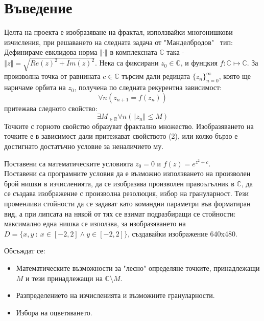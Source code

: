 \section{Въведение}
	\begin{Large}
	Целта на проекта е изобразяване на фрактал, използвайки многонишкови изчисления, при решаването на следната задача от "Манделбродов" \ тип:\\
	
	\indent Дефинираме евклидова норма $\left\Vert \cdot \right\Vert$ в комплексната $\mathbb{C}$ така - \ $\left\Vert z \right\Vert=\sqrt{Re(z)^2+Im(z)^2}$. Нека са фиксирани $z_{0}\in\mathbb{C}$, и фунцкия $f:\mathbb{C}\mapsto\mathbb{C}$. За произволна точка от равнината $c\in\mathbb{C}$ търсим дали редицата $\{z_{n}\}_{n=0}^{\infty}$, която ще наричаме орбита на $z_{0}$, получена по следната рекурентна зависимост: 
	\begin{equation} \label{eq:1}
	\forall{n} (z_{n+1}=f(z_{n}))
\end{equation}
притежава следното свойство:
	\begin{equation} \label{eq:2}
	\exists{M_{\in{\mathbb{R}}}} \forall{n} ( \left\Vert z_n \right\Vert \leq M)
\end{equation}
Точките с горното свойство образуват фрактално множество. Изобразяването на точките е в зависимост дали притежават свойството (2), или колко бързо е достигнато достатъчно условие за неналичието му.
\\

\vspace{0.3cm}

Поставени са математическите условията $z_{0}=0$ и $f(z)=e^{z^2+c}$. 
\\
\indent Поставени са програмните условия да е възможно използването на произволен брой нишки в изчисленията, да се изобразява произволен правоъгълник в $\mathbb{C}$, да се създава изображение с произволна резолюция, избор на грануларност. Тези променливи стойности да се задават като командни параметри във форматиран вид, а при липсата на някой от тях се взимат подразбиращи се стойности: максимално една нишка се използва, за изобразяването на $D=\{x,y \ : \ x\in[-2,2] \land y\in[-2,2]\}$, създавайки изображение 640x480.
\newline
\vspace{0.3cm}

Обсъждат се: 
\begin{itemize}
\item Математическите възможности за "лесно" определяне точките, принадлежащи $M$ и тези принадлежащи на $\mathbb{C} \setminus M$.
\item Разпределението на изчисленията и възможните грануларности.
\item Избора на оцветяването.
\end{itemize}

	\end{Large}


